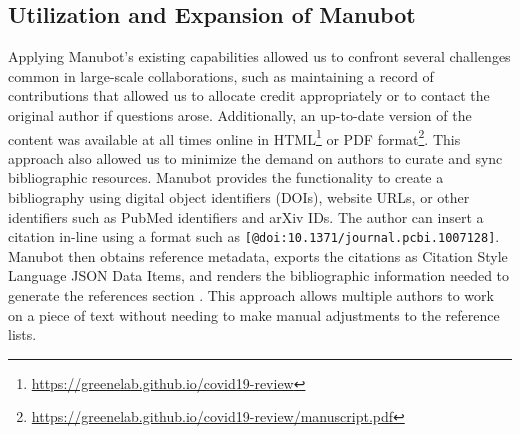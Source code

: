 \documentclass[twocolumn]{ceurart}
\begin{document}
\hypertarget{utilization-and-expansion-of-manubot}{%
\subsection{Utilization and Expansion of Manubot}\label{utilization-and-expansion-of-manubot}}

Applying Manubot's existing capabilities allowed us to confront several challenges common in large-scale collaborations, such as maintaining a record of contributions that allowed us to allocate credit appropriately or to contact the original author if questions arose.
Additionally, an up-to-date version of the content was available at all times online in HTML\footnote{\url{https://greenelab.github.io/covid19-review}} or PDF format\footnote{\url{https://greenelab.github.io/covid19-review/manuscript.pdf}}.
This approach also allowed us to minimize the demand on authors to curate and sync bibliographic resources.
Manubot provides the functionality to create a bibliography using digital object identifiers (DOIs), website URLs, or other identifiers such as PubMed identifiers and arXiv IDs.
The author can insert a citation in-line using a format such as \texttt{{[}@doi:10.1371/journal.pcbi.1007128{]}}.
Manubot then obtains reference metadata, exports the citations as Citation Style Language JSON Data Items, and renders the bibliographic information needed to generate the references section \citep{YuJbg3zO}.
This approach allows multiple authors to work on a piece of text without needing to make manual adjustments to the reference lists.
\end{document}
